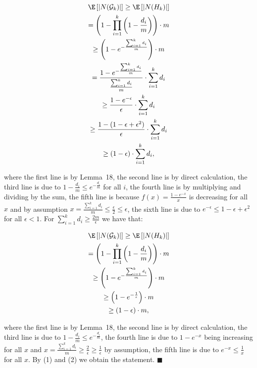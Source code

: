 \[\begin{gathered}
\displaystyle\E\left[|N(\mathcal{G}_{k})|\right] \displaystyle\geq\E\left[|N(H_{k})|\right] \\
\displaystyle=\left(1-\prod_{i=1}^{k}\left(1-\frac{d_{i}}{m}\right)\right)\cdot m \\
\displaystyle\geq\left(1-e^{-\frac{\sum_{i=1}^{k}d_{i}}{m}}\right)\cdot m \\
\displaystyle=\frac{1-e^{-\frac{\sum_{i=1}^{k}d_{i}}{m}}}{\frac{\sum_{i=1}^{k}d_{i}}{m}}\cdot\sum_{i=1}^{k}d_{i} \\
\displaystyle\geq\frac{1-e^{-\epsilon}}{\epsilon}\cdot\sum_{i=1}^{k}d_{i} \\
\displaystyle\geq\frac{1-(1-\epsilon+\epsilon^{2})}{\epsilon}\cdot\sum_{i=1}^{k}d_{i} \\
\displaystyle\geq\left(1-\epsilon\right)\cdot\sum_{i=1}^{k}d_{i},
\end{gathered}\]


where the first line is by Lemma 18, the second line is by direct calculation, the third line is due to $1-\frac{d_{i}}{m}\leq e^{-\frac{d_{i}}{m}}$ for all $i$, the fourth line is by multiplying and dividing by the sum, the fifth line is because $f(x)=\frac{1-e^{-x}}{x}$ is decreasing for all $x$ and by assumption $x=\frac{\sum_{i=1}^{k}d_{i}}{m}\leq\frac{\epsilon}{2}\leq\epsilon$, the sixth line is due to $e^{-\epsilon}\leq 1-\epsilon+\epsilon^{2}$ for all $\epsilon<1$.
For $\sum_{i=1}^{k}d_{i}\geq\frac{2m}{\epsilon}$ we have that:\par


\[\begin{gathered}
\displaystyle\E\left[|N(\mathcal{G}_{k})|\right] \displaystyle\geq\E\left[|N(H_{k})|\right] \\
\displaystyle=\left(1-\prod_{i=1}^{k}\left(1-\frac{d_{i}}{m}\right)\right)\cdot m \\
\displaystyle\geq\left(1-e^{-\frac{\sum_{i=1}^{k}d_{i}}{m}}\right)\cdot m \\
\displaystyle\geq\left(1-e^{-\frac{1}{\epsilon}}\right)\cdot m \\
\displaystyle\geq\left(1-\epsilon\right)\cdot m,
\end{gathered}\]


where the first line is by Lemma 18, the second line is by direct calculation, the third line is due to $1-\frac{d_{i}}{m}\leq e^{-\frac{d_{i}}{m}}$, the fourth line is due to $1-e^{-x}$ being increasing for all $x$ and $x=\frac{\sum_{i=1}^{k}d_{i}}{m}\geq\frac{2}{\epsilon}\geq\frac{1}{\epsilon}$ by assumption, the fifth line is due to $e^{-x}\leq\frac{1}{x}$ for all $x$.
By (1) and (2) we obtain the statement.
\ensuremath{\blacksquare}\par






